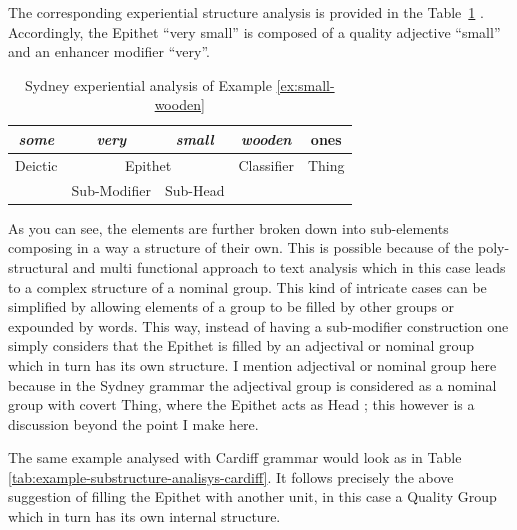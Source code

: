 The corresponding experiential structure analysis is provided in the \mbox{Table \ref{tab:example-substructure-analisys}} \citet[391]{Halliday2013}. Accordingly, the Epithet ``very small'' is composed of a quality adjective ``small'' and an enhancer modifier ``very''. 
 
\begin{table}[!ht]
    \centering
    \begin{tabular}{c|c|c|cc}
        \hline
        \multicolumn{1}{|c|}{\textit{some}}    & \textit{very}            & \textit{small}      & \multicolumn{1}{c|}{\textit{wooden}}     & \multicolumn{1}{c|}{ones}  \\ \hline
        \multicolumn{1}{|c|}{Deictic} & \multicolumn{2}{c|}{Epithet} & \multicolumn{1}{c|}{Classifier} & \multicolumn{1}{c|}{Thing} \\ \hline
        & Sub-Modifier  & Sub-Head   & \multicolumn{2}{c}{}                                         \\ \cline{2-3}
    \end{tabular}
    \caption{Sydney experiential analysis of Example \ref{ex:small-wooden}}
    \label{tab:example-substructure-analisys}
\end{table}

As you can see, the elements are further broken down into sub-elements composing in a way a structure of their own. This is possible because of the poly-structural and multi functional approach to text analysis which in this case leads to a complex structure of a nominal group. This kind of intricate cases can be simplified by allowing elements of a group to be filled by other groups or expounded by words. This way, instead of having a sub-modifier construction one simply considers that the Epithet is filled by an adjectival or nominal group which in turn has its own structure. I mention adjectival or nominal group here because in the Sydney grammar the adjectival group is considered as a nominal group with covert Thing, where the Epithet acts as Head\citep[391]{ifg4} ; this however is a discussion beyond the point I make here. 

The same example analysed with Cardiff grammar would look as in Table \ref{tab:example-substructure-analisys-cardiff}. It follows precisely the above suggestion of filling the Epithet with another unit, in this case a Quality Group which in turn has its own internal structure. 

